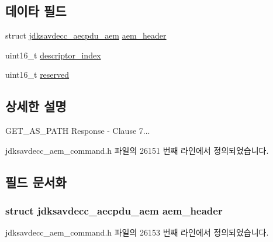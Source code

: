 \subsection*{데이타 필드}
\begin{DoxyCompactItemize}
\item 
struct \hyperlink{structjdksavdecc__aecpdu__aem}{jdksavdecc\+\_\+aecpdu\+\_\+aem} \hyperlink{structjdksavdecc__aem__command__get__as__path__response_ae1e77ccb75ff5021ad923221eab38294}{aem\+\_\+header}
\item 
uint16\+\_\+t \hyperlink{structjdksavdecc__aem__command__get__as__path__response_a042bbc76d835b82d27c1932431ee38d4}{descriptor\+\_\+index}
\item 
uint16\+\_\+t \hyperlink{structjdksavdecc__aem__command__get__as__path__response_a5a6ed8c04a3db86066924b1a1bf4dad3}{reserved}
\end{DoxyCompactItemize}


\subsection{상세한 설명}
G\+E\+T\+\_\+\+A\+S\+\_\+\+P\+A\+TH Response -\/ Clause 7... 

jdksavdecc\+\_\+aem\+\_\+command.\+h 파일의 26151 번째 라인에서 정의되었습니다.



\subsection{필드 문서화}
\subsubsection[{\texorpdfstring{aem\+\_\+header}{aem_header}}]{\setlength{\rightskip}{0pt plus 5cm}struct {\bf jdksavdecc\+\_\+aecpdu\+\_\+aem} aem\+\_\+header}\hypertarget{structjdksavdecc__aem__command__get__as__path__response_ae1e77ccb75ff5021ad923221eab38294}{}\label{structjdksavdecc__aem__command__get__as__path__response_ae1e77ccb75ff5021ad923221eab38294}


jdksavdecc\+\_\+aem\+\_\+command.\+h 파일의 26153 번째 라인에서 정의되었습니다.

